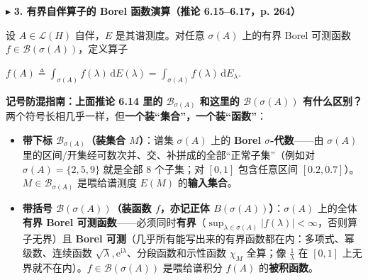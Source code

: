 \documentclass[11pt,a4paper]{article}
\providecommand{\tightlist}{\setlength{\itemsep}{2pt}\setlength{\parskip}{0pt}}
\newcommand{\SubSubHeading}[1]{%
  \Needspace{6.5\baselineskip}\vspace{5.5pt}\noindent
  \textcolor{AccentMain}{\scriptsize$\blacktriangleright$}\hspace{4pt}%
  {\small\bfseries\color{AccentMain}#1}\par\nopagebreak[4]\vspace{2.5pt}%
}
\renewenvironment{quote}{%
  \begin{tcolorbox}[
    enhanced,
    breakable,
    colback=AccentSoft!48!white,
    colframe=AccentMain,
    boxrule=0pt,
    leftrule=2.8pt,
    arc=2.5pt,
    left=9pt, right=8pt, top=6pt, bottom=6pt,
    before skip=5.5pt, after skip=5.5pt
  ]\small
}{%
  \end{tcolorbox}%
}
\newcommand{\FitDisplayMath}[1]{%
  \par\vspace{4.5pt}\noindent
  \begin{adjustbox}{max width=\linewidth, center}
    $\displaystyle #1$
  \end{adjustbox}
  \par\vspace{4.5pt}%
}
\begin{document}
\SubSubHeading{3. 有界自伴算子的 Borel 函数演算（推论 6.15--6.17，p. 264）}

设 \(A \in \mathcal{L}(H)\) 自伴，\(E\) 是其谱测度。对任意 \(\sigma(A)\) 上的有界 Borel 可测函数 \(f \in \mathcal{B}(\sigma(A))\)，定义算子 
\FitDisplayMath{f(A) \triangleq \int_{\sigma(A)} f(\lambda)\,\mathrm{d}E(\lambda) = \int_{\sigma(A)} f(\lambda)\,\mathrm{d}E_\lambda.}


\begin{quote}
\textbf{记号防混指南：上面推论 6.14 里的 \(\mathcal{B}_{\sigma(A)}\) 和这里的 \(\mathcal{B}(\sigma(A))\) 有什么区别？} 两个符号长相几乎一样，但\textbf{一个装``集合''，一个装``函数''}：

\begin{itemize}
\tightlist
\item
  \textbf{带下标 \(\mathcal{B}_{\sigma(A)}\)（装集合 \(M\)）}：谱集 \(\sigma(A)\) 上的 \textbf{Borel \(\sigma\)-代数}——由 \(\sigma(A)\) 里的区间/开集经可数次并、交、补拼成的全部``正常子集''（例如对 \(\sigma(A)=\{2,5,9\}\) 就是全部 \(8\) 个子集；对 \([0,1]\) 包含任意区间 \([0.2,0.7]\)）。\(M \in \mathcal{B}_{\sigma(A)}\) 是喂给谱测度 \(E(M)\) 的\textbf{输入集合}。
\item
  \textbf{带括号 \(\mathcal{B}(\sigma(A))\)（装函数 \(f\)，亦记正体 \(B(\sigma(A))\)）}：\(\sigma(A)\) 上的全体\textbf{有界 Borel 可测函数}——必须同时\textbf{有界}（\(\sup_{\lambda\in\sigma(A)}|f(\lambda)|<\infty\)，否则算子无界）且 \textbf{Borel 可测}（几乎所有能写出来的有界函数都在内：多项式、幂级数、连续函数 \(\sqrt{\lambda}, \mathrm{e}^{\mathrm{i}\lambda}\)、分段函数和示性函数 \(\chi_M\) 全算；像 \(\frac{1}{\lambda}\) 在 \([0,1]\) 上无界就不在内）。\(f \in \mathcal{B}(\sigma(A))\) 是喂给谱积分 \(f(A)\) 的\textbf{被积函数}。
\end{itemize}
\end{quote}
\end{document}
